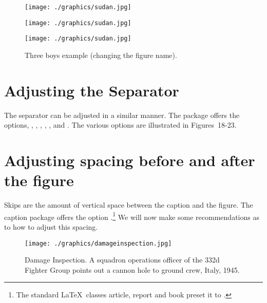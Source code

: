 \begin{teXXX}
\captionsetup{name=Figure.}
\end{teXXX}


\begin{figure*}[h]
\begin{commands}[]{}
\captionsetup{skip=3pt}
\captionsetup{font=small}
\captionsetup{name=Fig}
\captionsetup{labelfont=bf,textfont=it, format=plain}
\RaggedRight
\centering 
\begin{minipage}[t]{90pt}
 \texttt{[image: ./graphics/sudan.jpg]}
 \caption{\acaption }
\end{minipage}
\captionsetup{name=Figure}
\begin{minipage}[t]{90pt}
 \texttt{[image: ./graphics/sudan.jpg]}
 \caption{\acaption }
\end{minipage}
\captionsetup{name=Fig,labelsep=space}
\begin{minipage}[t]{90pt}
 \texttt{[image: ./graphics/sudan.jpg]}
 \caption{\acaption }
\end{minipage}
 \caption{Three boys example (changing the figure name).}
 \end{commands}
\end{figure*}


\section{Adjusting the Separator}


The separator can be adjusted in a similar manner. The package offers the options, , , , , ,  and .  The various options are illustrated
in \hbox{Figures~18-23}.


\section{Adjusting spacing before and after the figure}

Skips are the amount of vertical space between the caption and the figure. The caption package offers the option
.\footnote{The standard \LaTeX\ classes article, report and book preset it to .} We will now make some recommendations as to how to adjust this spacing.

\medskip

\begin{figure}[htp]
\centering

\captionsetup{name=Photo, labelsep=period, skip=5pt, position=bottom}
\texttt{[image: ./graphics/damageinspection.jpg]}
\caption{Damage Inspection.
A squadron operations officer of the 332d Fighter Group points out a cannon hole to ground crew, Italy, 1945.}
\end{figure}

